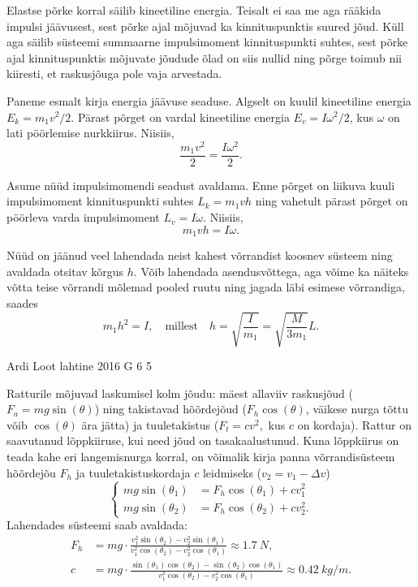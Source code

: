 \documentclass[11pt]{article}
\begin{document}
{{\ifSolution
Elastse põrke korral säilib kineetiline energia. Teisalt ei saa me aga rääkida impulsi jäävusest, sest põrke ajal mõjuvad ka kinnituspunktis suured jõud. Küll aga säilib süsteemi summaarne impulsimoment kinnituspunkti suhtes, sest põrke ajal kinnituspunktis mõjuvate jõudude õlad on siis nullid ning põrge toimub nii kiiresti, et raskusjõuga pole vaja arvestada.

Paneme esmalt kirja energia jäävuse seaduse. Algselt on kuulil kineetiline energia $E_k=m_1v^2/2$. Pärast põrget on vardal kineetiline energia $E_v=I\omega^2/2$, kus $\omega$ on lati pöörlemise nurkkiirus. Niisiis,
\[
\frac{m_1v^2}{2}=\frac{I\omega^2}{2}.
\]

Asume nüüd impulsimomendi seadust avaldama. Enne põrget on liikuva kuuli impulsimoment kinnituspunkti suhtes $L_k=m_1vh$ ning vahetult pärast põrget on pöörleva varda impulsimoment $L_v=I\omega$. Niisiis,
\[
m_1vh=I\omega.
\]

Nüüd on jäänud veel lahendada neist kahest võrrandist koosnev süsteem ning avaldada otsitav kõrgus $h$. Võib lahendada asendusvõttega, aga võime ka näiteks võtta teise võrrandi mõlemad pooled ruutu ning jagada läbi esimese võrrandiga, saades
\[
m_1h^2 = I,\quad \text{millest} \quad h = \sqrt{\frac{I}{m_1}}=\sqrt{\frac{M}{3m_1}}L.
\]
\fi
}

{Ardi Loot} %
{lahtine} %
{2016} %
{G 6} %
{5} %
{

\ifSolution
Ratturile mõjuvad laskumisel kolm jõudu: mäest allaviiv raskusjõud
($F_{a}=mg\sin(\theta)$) ning takistavad hõõrdejõud ($F_{h}\cos(\theta)$, väikese nurga tõttu võib $\cos(\theta)$ ära jätta)
ja tuuletakistus ($F_{t}=cv^{2},$ kus $c$ on kordaja). Rattur on
saavutanud lõppkiiruse, kui need jõud on tasakaalustunud. Kuna lõppkiirus
on teada kahe eri langemisnurga korral, on võimalik kirja panna võrrandisüsteem
hõõrdejõu $F_{h}$ ja tuuletakistuskordaja $c$ leidmiseks ($v_{2}=v_{1}-\Delta v$) 
\[
\begin{cases}
mg\sin(\theta_{1})&=F_{h}\cos(\theta_1)+cv_{1}^{2}\\
mg\sin(\theta_{2})&=F_{h}\cos(\theta_2)+cv_{2}^{2}.
\end{cases}
\]
Lahendades süsteemi saab avaldada:
\begin{align*}
F_{h} & = mg\cdot\frac{v_{1}^{2}\sin(\theta_{2})-v_{2}^{2}\sin(\theta_{1})}{v_{1}^{2}\cos(\theta_2)-v_{2}^{2}\cos(\theta_1)}\approx\SI{1.7}{N},\\[7pt] 
c & = mg\cdot\frac{\sin(\theta_{1})\cos(\theta_2)-\sin(\theta_{2})\cos(\theta_1)}{v_{1}^{2}\cos(\theta_2)-v_{2}^{2}\cos(\theta_1)}\approx\SI{0.42}{kg/m}.
\end{align*}

}}
\end{document}
